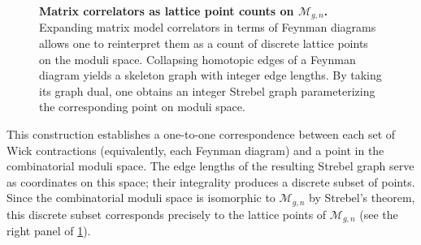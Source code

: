 \documentclass[a4paper,11pt,english]{article}
\theoremstyle{plain}
\theoremstyle{definition}
\theoremstyle{plain}
\newcommand{\M}{\mathcal{M}}
\begin{document}
\begin{figure}[t]
    \caption{
    \textbf{Matrix correlators as lattice point counts on $\M_{g,n}$.}
    Expanding matrix model correlators in terms of Feynman diagrams allows one to reinterpret them as a count of discrete lattice points on the moduli space. Collapsing homotopic edges of a Feynman diagram yields a skeleton graph with integer edge lengths. By taking its graph dual, one obtains an integer Strebel graph parameterizing the corresponding point on moduli space.
    }
    \label{fig:FDtoMgn}
\end{figure}

This construction establishes a one-to-one correspondence between each set of Wick contractions (equivalently, each Feynman diagram) and a point in the combinatorial moduli space. The edge lengths of the resulting Strebel graph serve as coordinates on this space; their integrality produces a discrete subset of points. Since the combinatorial moduli space is isomorphic to $\M_{g,n}$ by Strebel's theorem, this discrete subset corresponds precisely to the lattice points of $\M_{g,n}$ (see the right panel of \cref{fig:FDtoMgn}).
\end{document}
